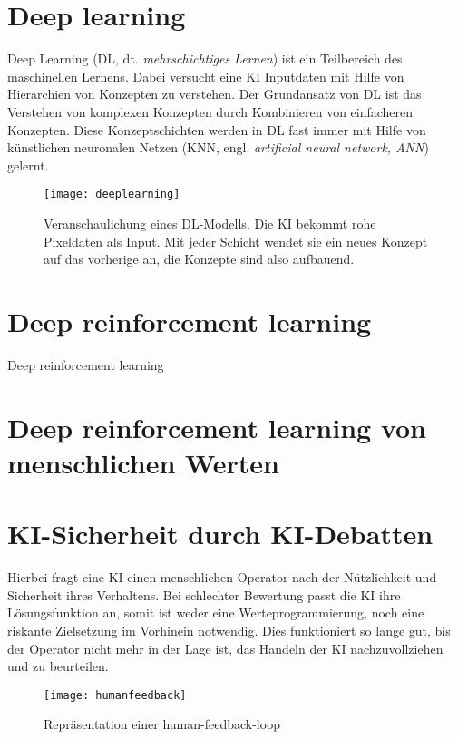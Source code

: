 \section{Deep learning}
Deep Learning (DL, dt. \emph{mehrschichtiges Lernen}) ist ein Teilbereich des maschinellen Lernens. Dabei versucht eine KI Inputdaten mit Hilfe von Hierarchien von Konzepten zu verstehen. Der Grundansatz von DL ist das Verstehen von komplexen Konzepten durch Kombinieren von einfacheren Konzepten.  Diese Konzeptschichten werden in DL fast immer mit Hilfe von künstlichen neuronalen Netzen (KNN, engl. \emph{artificial neural network, ANN}) gelernt. 



\begin{figure}
  \texttt{[image: deeplearning]}
  \caption{Veranschaulichung eines DL-Modells. Die KI bekommt rohe Pixeldaten als Input. Mit jeder Schicht wendet sie ein neues Konzept auf das vorherige an, die Konzepte sind also aufbauend.  }
  \label{deeplearningimg}
\end{figure}
\section{Deep reinforcement learning}

Deep reinforcement learning

\section{Deep reinforcement learning von menschlichen Werten}

\section{KI-Sicherheit durch KI-Debatten}

Hierbei fragt eine KI einen menschlichen Operator nach der Nützlichkeit und Sicherheit ihres Verhaltens. Bei schlechter Bewertung passt die KI ihre Lösungsfunktion an, somit ist weder eine Werteprogrammierung, noch eine riskante Zielsetzung im Vorhinein notwendig.  Dies funktioniert so lange gut, bis der Operator nicht mehr in der Lage ist, das Handeln der KI nachzuvollziehen und zu beurteilen. 

\begin{figure}
  \texttt{[image: humanfeedback]}
  \caption{Repräsentation einer human-feedback-loop}
  \label{humanfeedbackimg}
\end{figure}

